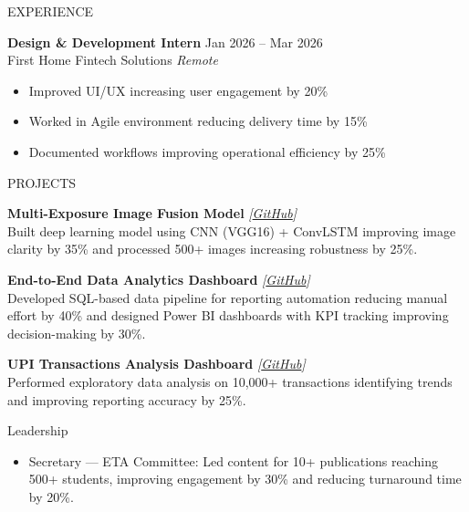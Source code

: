 \documentclass{resume}
\begin{document}
\begin{rSection}{EXPERIENCE}

\textbf{Design \& Development Intern} \hfill Jan 2026 – Mar 2026\\
First Home Fintech Solutions \hfill \textit{Remote}
\begin{itemize}
\itemsep -3pt
\item Improved UI/UX increasing user engagement by 20\%
\item Worked in Agile environment reducing delivery time by 15\%
\item Documented workflows improving operational efficiency by 25\%
\end{itemize}

\end{rSection}

\begin{rSection}{PROJECTS}

\vspace{-0.5em}

\item \textbf{Multi-Exposure Image Fusion Model} \textit{[\href{https://github.com/alfiya3022/your-repo1}{GitHub}]} \\
Built deep learning model using CNN (VGG16) + ConvLSTM improving image clarity by 35\% and processed 500+ images increasing robustness by 25\%.

\item \textbf{End-to-End Data Analytics Dashboard} \textit{[\href{https://github.com/alfiya3022/power-bi-sales-analysis-dashboard}{GitHub}]} \\
Developed SQL-based data pipeline for reporting automation reducing manual effort by 40\% and designed Power BI dashboards with KPI tracking improving decision-making by 30\%.

\item \textbf{UPI Transactions Analysis Dashboard} \textit{[\href{https://github.com/alfiya3022/your-repo3}{GitHub}]} \\
Performed exploratory data analysis on 10,000+ transactions identifying trends and improving reporting accuracy by 25\%.

\end{rSection}

\begin{rSection}{Leadership}

\begin{itemize}
\itemsep -3pt
\item Secretary — ETA Committee: Led content for 10+ publications reaching 500+ students, improving engagement by 30\% and reducing turnaround time by 20\%.
\end{itemize}

\end{rSection}
\end{document}

